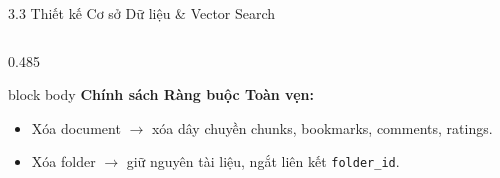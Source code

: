 \documentclass[10pt, aspectratio=169]{beamer}
\begin{document}
\begin{frame}[t]{3.3 Thiết kế Cơ sở Dữ liệu \& Vector Search}
\begin{columns}[T,onlytextwidth]
\begin{column}{0.485\textwidth}
            \vspace{-0.05cm}
            \begin{beamercolorbox}[sep=4pt, rounded=true]{block body}
                \scriptsize
                \textbf{\textcolor{primaryblue}{Chính sách Ràng buộc Toàn vẹn:}}
                \begin{itemize}
                    \setlength{\itemsep}{1pt}
                    \setlength{\parskip}{0pt}
                    \item Xóa document $\rightarrow$ xóa dây chuyền chunks, bookmarks, comments, ratings.
                    \item Xóa folder $\rightarrow$ giữ nguyên tài liệu, ngắt liên kết \texttt{folder\_id}.
                \end{itemize}
            \end{beamercolorbox}
        \end{column}
    \end{columns}
\end{frame}
\end{document}
